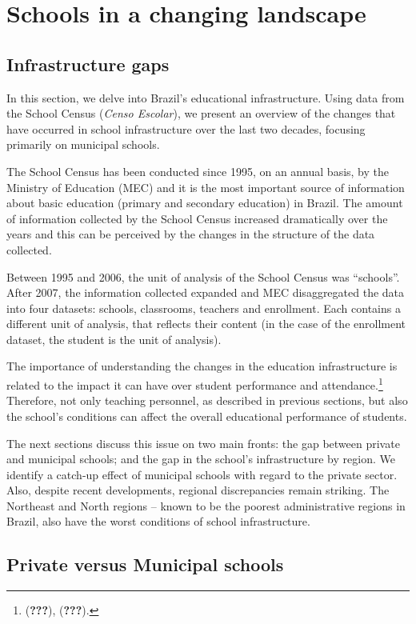 \documentclass[12pt,]{article}
\let\rmarkdownfootnote\footnote%
\def\footnote{\protect\rmarkdownfootnote}
\begin{document}
\section{Schools in a changing landscape}

\subsection{Infrastructure gaps}

In this section, we delve into Brazil's educational infrastructure.
Using data from the School Census (\emph{Censo Escolar}), we present an
overview of the changes that have occurred in school infrastructure over
the last two decades, focusing primarily on municipal schools.

The School Census has been conducted since 1995, on an annual basis, by
the Ministry of Education (MEC) and it is the most important source of
information about basic education (primary and secondary education) in
Brazil. The amount of information collected by the School Census
increased dramatically over the years and this can be perceived by the
changes in the structure of the data collected.

Between 1995 and 2006, the unit of analysis of the School Census was
``schools''. After 2007, the information collected expanded and MEC
disaggregated the data into four datasets: schools, classrooms, teachers
and enrollment. Each contains a different unit of analysis, that
reflects their content (in the case of the enrollment dataset, the
student is the unit of analysis).

The importance of understanding the changes in the education
infrastructure is related to the impact it can have over student
performance and attendance.\footnote{({\textbf{???}}), ({\textbf{???}}).}
Therefore, not only teaching personnel, as described in previous
sections, but also the school's conditions can affect the overall
educational performance of students.

The next sections discuss this issue on two main fronts: the gap between
private and municipal schools; and the gap in the school's
infrastructure by region. We identify a catch-up effect of municipal
schools with regard to the private sector. Also, despite recent
developments, regional discrepancies remain striking. The Northeast and
North regions -- known to be the poorest administrative regions in
Brazil, also have the worst conditions of school infrastructure.

\subsection{Private versus Municipal schools}
\end{document}
